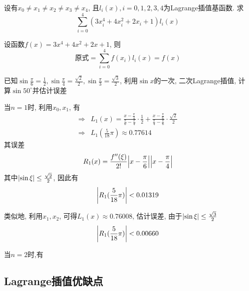 \begin{example}
    设有$x_0\ne x_1\ne x_2\ne x_3\ne x_4$, 且$l_i(x),i=0,1,2,3,4$为Lagrange插值基函数. 求
    \begin{equation*}
        \sum_{i=0}^4\left(3x_i^4+4x_i^2+2x_i+1\right)l_i(x)
    \end{equation*}
\end{example}

\begin{solution}
    设函数$f(x)=3x^4+4x^2+2x+1$, 则
    \begin{equation*}
        \text{原式}=\sum_{i=0}^4f(x_i)l_i(x)=f(x)
    \end{equation*}
\end{solution}

\begin{example}
    已知$\sin\frac{\pi}{6}=\frac{1}{2},\sin\frac{\pi}{4}=\frac{\sqrt{2}}{2},\sin\frac{\pi}{3}=\frac{\sqrt{3}}{2}$, 利用$\sin{x}$的一次, 二次Lagrange插值, 计算$\sin{50^\circ}$并估计误差
\end{example}

\begin{solution}
    当$n=1$时, 利用$x_0, x_1$, 有
    \begin{align*}
        \Rightarrow &L_1(x)=\frac{x-\frac{\pi}{4}}{\frac{\pi}{6}-\frac{\pi}{4}}\cdot\frac{1}{2}+\frac{x-\frac{\pi}{6}}{\frac{\pi}{4}-\frac{\pi}{6}}\cdot\frac{\sqrt{2}}{2}\\
        \Rightarrow &L_1(\frac{5}{18}\pi)\approx0.77614
    \end{align*}
    其误差
    \begin{equation*}
        R_1(x)=\frac{f''(\xi)}{2!}\abs{x-\frac{\pi}{6}}\abs{x-\frac{\pi}{4}}
    \end{equation*}
    其中$\abs{\sin{\xi}}\le\frac{\sqrt{2}}{2}$, 因此有
    \begin{equation*}
        \abs{R_1(\frac{5}{18}\pi)}<0.01319
    \end{equation*}

    类似地, 利用$x_1,x_2$, 可得$L_1(x)\approx0.76008$, 估计误差, 由于$\abs{\sin{\xi}}\le\frac{\sqrt{3}}{2}$
    \begin{equation*}
        \abs{R_1(\frac{5}{18}\pi)}<0.00660
    \end{equation*}

    当$n=2$时,有
\end{solution}


\subsection{Lagrange插值优缺点}

